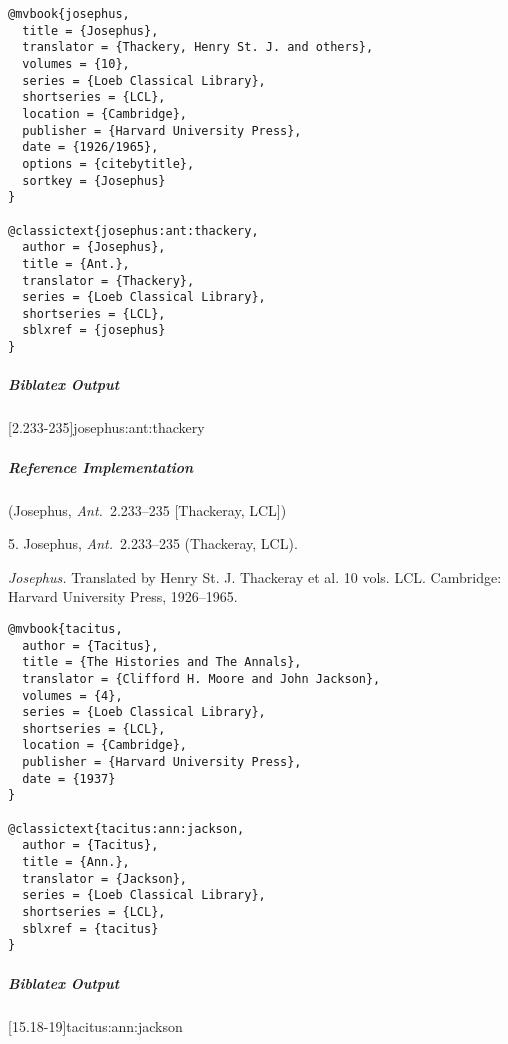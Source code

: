 \documentclass[a4paper]{article}
\newenvironment{biboutput}{%
  \subparagraph{Biblatex Output}
}{\color{black}}
\newenvironment{refimp}{%
  \subparagraph{Reference Implementation}
  \color{reference-colour}
  \rm
}{\par\color{black}}
\begin{document}
\medskip

\begin{lstlisting}
@mvbook{josephus,
  title = {Josephus},
  translator = {Thackery, Henry St. J. and others},
  volumes = {10},
  series = {Loeb Classical Library},
  shortseries = {LCL},
  location = {Cambridge},
  publisher = {Harvard University Press},
  date = {1926/1965},
  options = {citebytitle},
  sortkey = {Josephus}
}

@classictext{josephus:ant:thackery,
  author = {Josephus},
  title = {Ant.},
  translator = {Thackery},
  series = {Loeb Classical Library},
  shortseries = {LCL},
  sblxref = {josephus}
}
\end{lstlisting}

\begin{biboutput}
  [2.233-235]{josephus:ant:thackery}
\end{biboutput}

\begin{refimp}
  (Josephus, \emph{Ant.}\ 2.233–235 [Thackeray, LCL])

  5. Josephus, \emph{Ant.}\ 2.233–235 (Thackeray, LCL).

  \hangindent\bibindent \emph{Josephus.} Translated by Henry St. J. Thackeray
  et al. 10 vols. LCL. Cambridge: Harvard University Press, 1926–1965.

\end{refimp}

\medskip

\begin{lstlisting}
@mvbook{tacitus,
  author = {Tacitus},
  title = {The Histories and The Annals},
  translator = {Clifford H. Moore and John Jackson},
  volumes = {4},
  series = {Loeb Classical Library},
  shortseries = {LCL},
  location = {Cambridge},
  publisher = {Harvard University Press},
  date = {1937}
}

@classictext{tacitus:ann:jackson,
  author = {Tacitus},
  title = {Ann.},
  translator = {Jackson},
  series = {Loeb Classical Library},
  shortseries = {LCL},
  sblxref = {tacitus}
}
\end{lstlisting}

\begin{biboutput}
  [15.18-19]{tacitus:ann:jackson}
\end{biboutput}
\end{document}
